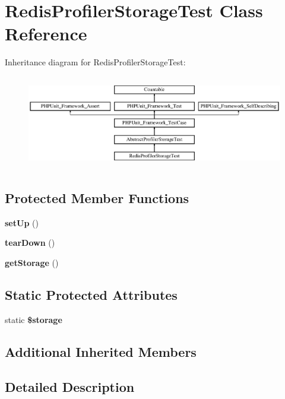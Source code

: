 \section{Redis\+Profiler\+Storage\+Test Class Reference}
\label{class_symfony_1_1_component_1_1_http_kernel_1_1_tests_1_1_profiler_1_1_redis_profiler_storage_test}
Inheritance diagram for Redis\+Profiler\+Storage\+Test\+:\begin{figure}[H]
\begin{center}
\leavevmode
\includegraphics[height=4.129793cm]{class_symfony_1_1_component_1_1_http_kernel_1_1_tests_1_1_profiler_1_1_redis_profiler_storage_test}
\end{center}
\end{figure}
\subsection*{Protected Member Functions}
\begin{DoxyCompactItemize}
\item 
{\bf set\+Up} ()
\item 
{\bf tear\+Down} ()
\item 
{\bf get\+Storage} ()
\end{DoxyCompactItemize}
\subsection*{Static Protected Attributes}
\begin{DoxyCompactItemize}
\item 
static {\bf \$storage}
\end{DoxyCompactItemize}
\subsection*{Additional Inherited Members}


\subsection{Detailed Description}


